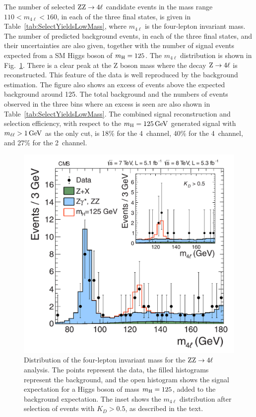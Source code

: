 \documentclass[11pt,twoside,a4paper,cmspaper,final]{cms-tdr}
\begin{document}
The number of selected $\mathrm{Z}\mathrm{Z}\rightarrow 4\ell$ candidate events in the mass range $110 < m_{4\ell} < 160$\GeV,
in each of the three final states, is given in
Table~\ref{tab:SelectYieldsLowMass}, where $m_{4\ell}$ is the
four-lepton invariant mass.
The number of predicted background events, in each of the three final states, and their uncertainties are also given,
together with the number of signal events expected from a SM Higgs boson
of $m_{\mathrm{H}} = 125$\GeV.
The $m_{4\ell}$ distribution is shown in Fig.~\ref{fig:ZZmass}.
There is a clear peak at the Z boson mass where the decay
$\mathrm{Z}\to 4\ell$ is reconstructed.
This feature of the data is well reproduced by the background estimation.
The figure also shows an excess of events above the expected
background around 125\GeV.
The total background and the numbers of events observed in
the three bins where an excess is seen are also shown in Table~\ref{tab:SelectYieldsLowMass}.
The combined signal reconstruction and selection efficiency, with respect to the $m_{\mathrm{H}} = 125\,\text{Ge\hspace{-.08em}V}$ generated signal with  $m_{\ell\ell} > 1\,\text{Ge\hspace{-.08em}V}$ as the only cut, is 18\% for the 4\Pe\ channel, 40\% for the 4\Pgm\ channel, and 27\% for the 2\Pgm\ channel.

\begin{figure}[htbp]
   \begin{center}
     \includegraphics[width=\cmsFigWideWidth]{H4l_mass_v3}
     \caption{\label{fig:ZZmass} Distribution of the four-lepton invariant mass
       for the $\mathrm{Z}\mathrm{Z}\to 4\ell$ analysis.
The points represent the data, the filled histograms represent the background,
and the open histogram shows the signal expectation for a Higgs boson
of mass $m_{\mathrm{H}} = 125$\GeV, added to the background expectation.
The inset shows the $m_{4\ell}$ distribution after selection of events with
$K_D > 0.5$, as described in the text.
}
   \end{center}
\end{figure}
\end{document}
